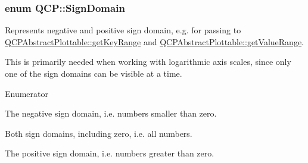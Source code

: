 \subsubsection[{\texorpdfstring{Sign\+Domain}{SignDomain}}]{\setlength{\rightskip}{0pt plus 5cm}enum {\bf Q\+C\+P\+::\+Sign\+Domain}}\hypertarget{namespaceQCP_afd50e7cf431af385614987d8553ff8a9}{}\label{namespaceQCP_afd50e7cf431af385614987d8553ff8a9}
Represents negative and positive sign domain, e.\+g. for passing to \hyperlink{classQCPAbstractPlottable_a4da16d3cd4b509e1104a9b0275623c96}{Q\+C\+P\+Abstract\+Plottable\+::get\+Key\+Range} and \hyperlink{classQCPAbstractPlottable_a4de773988b21ed090fddd27c6a3a3dcb}{Q\+C\+P\+Abstract\+Plottable\+::get\+Value\+Range}.

This is primarily needed when working with logarithmic axis scales, since only one of the sign domains can be visible at a time. \begin{Desc}
\item[Enumerator]\par
\begin{description}
\item[{\em 
sd\+Negative\hypertarget{namespaceQCP_afd50e7cf431af385614987d8553ff8a9a2d18af0bc58f6528d1e82ce699fe4829}{}\label{namespaceQCP_afd50e7cf431af385614987d8553ff8a9a2d18af0bc58f6528d1e82ce699fe4829}
}]The negative sign domain, i.\+e. numbers smaller than zero. \item[{\em 
sd\+Both\hypertarget{namespaceQCP_afd50e7cf431af385614987d8553ff8a9aa38352ef02d51ddfa4399d9551566e24}{}\label{namespaceQCP_afd50e7cf431af385614987d8553ff8a9aa38352ef02d51ddfa4399d9551566e24}
}]Both sign domains, including zero, i.\+e. all numbers. \item[{\em 
sd\+Positive\hypertarget{namespaceQCP_afd50e7cf431af385614987d8553ff8a9a584784b75fb816abcc627cf743bb699f}{}\label{namespaceQCP_afd50e7cf431af385614987d8553ff8a9a584784b75fb816abcc627cf743bb699f}
}]The positive sign domain, i.\+e. numbers greater than zero. \end{description}
\end{Desc}
